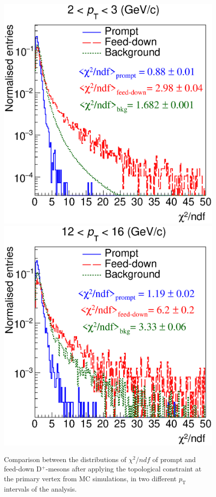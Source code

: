 \documentclass[b5paper,10pt,twoside,oldstyle,classica]{toptesi}
\newcommand{\pt}{p_\text{T}}
\begin{document}
\begin{figure}[tb]
\begin{center}
{\includegraphics[scale = 0.32]{KFchi_Dplus_pT1.eps}}
\hspace{-0.5cm}
{\includegraphics[scale = 0.32]{KFchi_Dplus_pT8.eps}}
\caption{Comparison between the distributions of $\chi^2/ndf$ of prompt and feed-down D$^+$-mesons after applying the topological constraint at the primary vertex from MC simulations, in two different $\pt$ intervals of the analysis.}
\label{KF_chi}
\end{center}
\end{figure} 
\end{document}
